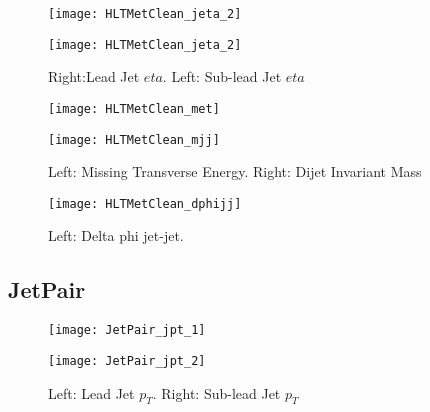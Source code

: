 \documentclass[a4paper,10pt]{article}
\begin{document}
\begin{figure}[!h]
\centering
\begin{minipage}[!h]{0.4\linewidth}
\centering
\texttt{[image: HLTMetClean\_jeta\_2]}
\end{minipage}%
\begin{minipage}[!h]{0.4\linewidth}
\centering
\texttt{[image: HLTMetClean\_jeta\_2]}
\end{minipage}
\caption{Right:Lead Jet $eta$. Left: Sub-lead Jet $eta$}
\end{figure}

\begin{figure}[!h]
\centering
\begin{minipage}[!h]{0.4\linewidth}
\centering
\texttt{[image: HLTMetClean\_met]}
\end{minipage}%
\begin{minipage}[!h]{0.4\linewidth}
\centering
\texttt{[image: HLTMetClean\_mjj]}
\end{minipage}
\caption{Left: Missing Transverse Energy. Right: Dijet Invariant Mass}
\end{figure}

\begin{figure}[!h]
\centering
\begin{minipage}[!h]{0.4\linewidth}
\centering
\texttt{[image: HLTMetClean\_dphijj]}
\end{minipage}%
\begin{minipage}[!h]{0.4\linewidth}
\centering
\end{minipage}
\caption{Left: Delta phi jet-jet.}
\end{figure}

\clearpage
\subsection{JetPair}  
              
\begin{figure}[!h]
\centering
\begin{minipage}[!h]{0.4\linewidth}
\centering
\texttt{[image: JetPair\_jpt\_1]}
\end{minipage}%
\begin{minipage}[!h]{0.4\linewidth}
  \texttt{[image: JetPair\_jpt\_2]}
\end{minipage}
\caption{Left: Lead Jet $p_T$. Right: Sub-lead Jet $p_T$}
\end{figure}
\end{document}
